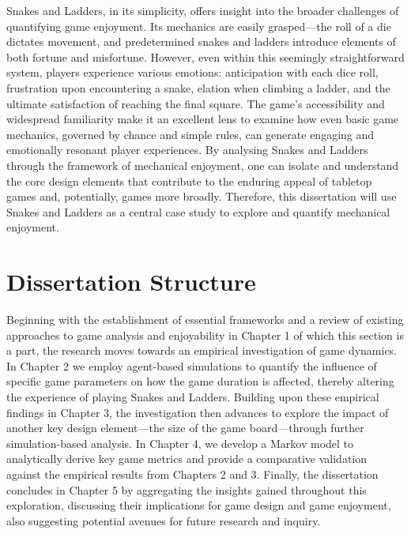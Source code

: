 Snakes and Ladders, in its simplicity, offers insight into the broader challenges of quantifying game enjoyment. Its mechanics are easily grasped—the roll of a die dictates movement, and predetermined snakes and ladders introduce elements of both fortune and misfortune. However, even within this seemingly straightforward system, players experience various emotions: anticipation with each dice roll, frustration upon encountering a snake, elation when climbing a ladder, and the ultimate satisfaction of reaching the final square. The game's accessibility and widespread familiarity make it an excellent lens to examine how even basic game mechanics, governed by chance and simple rules, can generate engaging and emotionally resonant player experiences. By analysing Snakes and Ladders through the framework of mechanical enjoyment, one can isolate and understand the core design elements that contribute to the enduring appeal of tabletop games and, potentially, games more broadly. Therefore, this dissertation will use Snakes and Ladders as a central case study to explore and quantify mechanical enjoyment.

\section{Dissertation Structure}
Beginning with the establishment of essential frameworks and a review of existing approaches to game analysis and enjoyability in Chapter 1 of which this section is a part, the research moves towards an empirical investigation of game dynamics. In Chapter 2 we employ agent-based simulations to quantify the influence of specific game parameters on how the game duration is affected, thereby altering the experience of playing Snakes and Ladders.  Building upon these empirical findings in Chapter 3, the investigation then advances to explore the impact of another key design element—the size of the game board—through further simulation-based analysis.  In Chapter 4, we develop a Markov model to analytically derive key game metrics and provide a comparative validation against the empirical results from Chapters 2 and 3.  Finally, the dissertation concludes in Chapter 5 by aggregating the insights gained throughout this exploration, discussing their implications for game design and game enjoyment, also suggesting potential avenues for future research and inquiry. 
